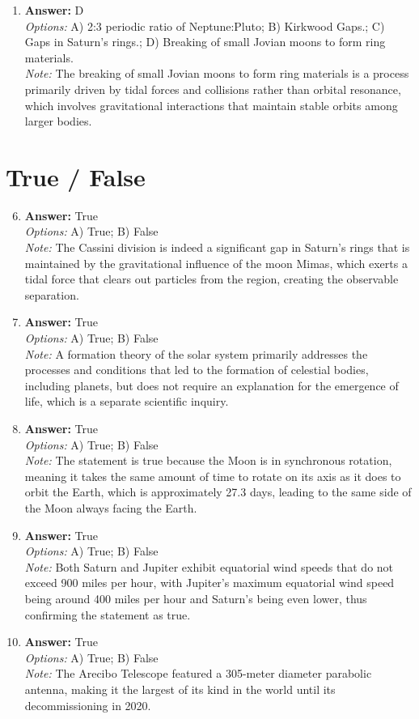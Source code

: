 \documentclass[12pt]{article}
\begin{document}
\begin{enumerate}[label=\arabic*.]
\item \textbf{Answer:} D
\\ \textit{Options:} A) 2:3 periodic ratio of Neptune:Pluto; B) Kirkwood Gaps.; C) Gaps in Saturn's rings.; D) Breaking of small Jovian moons to form ring materials.
\\ \textit{Note:} The breaking of small Jovian moons to form ring materials is a process primarily driven by tidal forces and collisions rather than orbital resonance, which involves gravitational interactions that maintain stable orbits among larger bodies.
\end{enumerate}

\section*{True / False}
\begin{enumerate}[label=\arabic*.]
\setcounter{enumi}{5}
\item \textbf{Answer:} True
\\ \textit{Options:} A) True; B) False
\\ \textit{Note:} The Cassini division is indeed a significant gap in Saturn's rings that is maintained by the gravitational influence of the moon Mimas, which exerts a tidal force that clears out particles from the region, creating the observable separation.
\item \textbf{Answer:} True
\\ \textit{Options:} A) True; B) False
\\ \textit{Note:} A formation theory of the solar system primarily addresses the processes and conditions that led to the formation of celestial bodies, including planets, but does not require an explanation for the emergence of life, which is a separate scientific inquiry.
\item \textbf{Answer:} True
\\ \textit{Options:} A) True; B) False
\\ \textit{Note:} The statement is true because the Moon is in synchronous rotation, meaning it takes the same amount of time to rotate on its axis as it does to orbit the Earth, which is approximately 27.3 days, leading to the same side of the Moon always facing the Earth.
\item \textbf{Answer:} True
\\ \textit{Options:} A) True; B) False
\\ \textit{Note:} Both Saturn and Jupiter exhibit equatorial wind speeds that do not exceed 900 miles per hour, with Jupiter's maximum equatorial wind speed being around 400 miles per hour and Saturn's being even lower, thus confirming the statement as true.
\item \textbf{Answer:} True
\\ \textit{Options:} A) True; B) False
\\ \textit{Note:} The Arecibo Telescope featured a 305-meter diameter parabolic antenna, making it the largest of its kind in the world until its decommissioning in 2020.
\end{enumerate}
\end{document}
